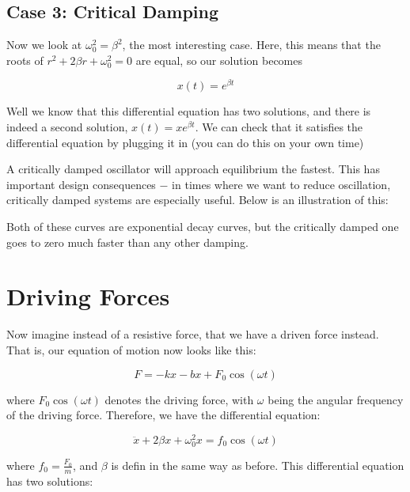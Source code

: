 \subsection{Case 3: Critical Damping}

Now we look at $\omega_0^2 = \beta^2$, the most interesting case. Here, this means that the roots of $r^2 + 2\beta r + \omega_0^2 = 0$ are equal, so our solution becomes

\[ x(t) = e^{\beta t}\] 

Well we know that this differential equation has two solutions, and there is indeed a second solution, $x(t) = xe^{\beta t}$. We can check that it satisfies the differential equation by plugging it in (you can do this on your own time)

A critically damped oscillator will approach equilibrium the fastest. This has important design consequences $-$ in times where we want to reduce oscillation, critically damped systems are especially useful. Below is an illustration of this: 

\begin{center}
\end{center}

Both of these curves are exponential decay curves, but the critically damped one goes to zero much faster than any other damping.

\section{Driving Forces}

Now imagine instead of a resistive force, that we have a driven force instead. That is, our equation of motion now looks like this: 

\[ F = -kx - bx + F_0 \cos(\omega t)\] 

where $F_0 \cos(\omega t)$ denotes the driving force, with $\omega$ being the angular frequency of the driving force. Therefore, we have the differential equation:

\[ \ddot x + 2\beta x + \omega_0^2x = f_0 \cos(\omega t)\] 

where $f_0 = \frac{F_0}{m}$, and $\beta$ is defin in the same way as before. This differential equation has two solutions: 

